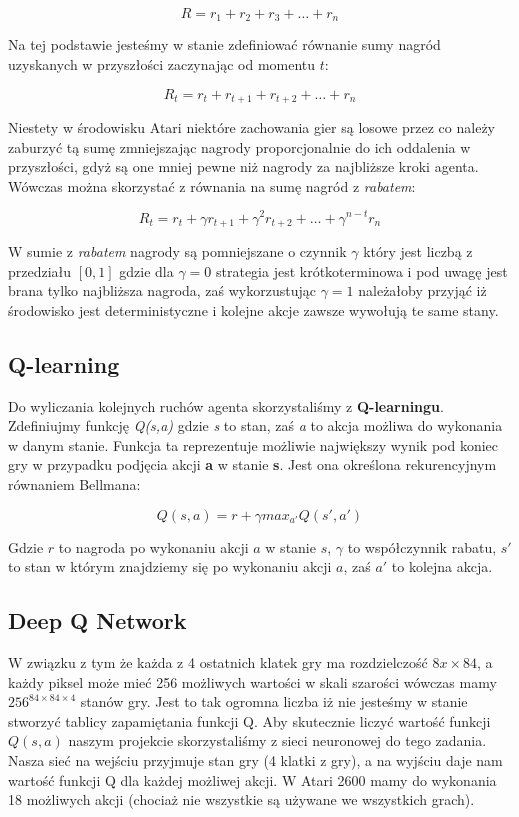 \documentclass[12pt]{article}
\begin{document}
$$R=r_1 + r_2 + r_3 + \dots + r_n$$

Na tej podstawie jesteśmy w stanie zdefiniować równanie sumy nagród uzyskanych w przyszłości zaczynając od momentu $t$:

$$R_t=r_t + r_{t+1}+ r_{t+2} + \dots + r_n$$

Niestety w środowisku Atari niektóre zachowania gier są losowe przez co należy zaburzyć tą sumę zmniejszając nagrody proporcjonalnie do ich oddalenia w przyszłości, gdyż są one mniej pewne niż nagrody za najbliższe kroki agenta. Wówczas można skorzystać z równania na sumę nagród z \textit{rabatem}:

$$R_t=r_t + \gamma r_{t+1}+  \gamma^2 r_{t+2} + \dots + \gamma^{n-t}r_n$$

W sumie z \textit{rabatem} nagrody są pomniejszane o czynnik $\gamma$ który jest liczbą z przedziału $[0,1]$ gdzie dla $\gamma =0$ strategia jest krótkoterminowa i pod uwagę jest brana tylko najbliższa nagroda, zaś wykorzustując $\gamma =1$ należałoby przyjąć iż środowisko jest deterministyczne i kolejne akcje zawsze wywołują te same stany.

\subsection{Q-learning}

Do wyliczania kolejnych ruchów agenta skorzystaliśmy z \textbf{Q-learningu}. Zdefiniujmy funkcję \textit{Q(s,a)} gdzie \textit{s} to stan, zaś \textit{a} to akcja możliwa do wykonania w danym stanie. Funkcja ta reprezentuje możliwie największy wynik pod koniec gry w przypadku podjęcia akcji \textbf{a} w stanie \textbf{s}. Jest ona określona rekurencyjnym równaniem Bellmana:

$$Q(s,a) =  r + \gamma max_{a'}Q(s',a')$$

Gdzie $r$ to nagroda po wykonaniu akcji $a$ w stanie $s$, $\gamma$ to współczynnik rabatu, $s'$ to stan w którym znajdziemy się po wykonaniu akcji $a$, zaś $a'$ to kolejna akcja.

\subsection{Deep Q Network}

W związku z tym że każda z 4 ostatnich klatek gry ma rozdzielczość $8x\times 84$, a każdy piksel może mieć 256 możliwych wartości w skali szarości wówczas mamy $256^{84\times84\times4}$ stanów gry. Jest to tak ogromna liczba iż nie jesteśmy w stanie stworzyć tablicy zapamiętania funkcji Q.
Aby skutecznie liczyć wartość funkcji $Q(s,a)$ naszym projekcie skorzystaliśmy z sieci neuronowej do tego zadania. Nasza sieć na wejściu przyjmuje stan gry (4 klatki z gry), a na wyjściu daje nam wartość funkcji Q dla każdej możliwej akcji. W Atari 2600 mamy do wykonania 18 możliwych akcji (chociaż nie wszystkie są używane we wszystkich grach).
\\\
\end{document}
